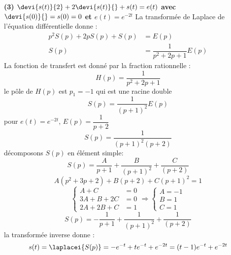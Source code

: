 \newpage
\question{}
\textbf{(3) $\devi{s(t)}{2} + 2\devi{s(t)}{} + s(t)=e(t)$ 
avec $\devi{s(0)}{}=s(0)=0$ et $e(t) = e^{-2t}$}
La transformée de Laplace de l'équation différentielle donne :
\begin{align*}
    p^2S(p)+2pS(p)+S(p)&=E(p) \\
    S(p)&=\dfrac{1}{p^2+2p+1}E(p)
\end{align*}
La fonction de transfert est donné par la fraction rationnelle :
$$
H(p)=\dfrac{1}{p^2+2p+1}
$$
le pôle de $H(p)$ est $p_1=-1$ qui est une racine double
$$
S(p) = \dfrac{1}{(p+1)^2}E(p)
$$
pour $e(t)=e^{-2t}$, $E(p)=\dfrac{1}{p+2}$
$$
S(p)=\dfrac{1}{(p+1)^2(p+2)}
$$
décomposons $S(p)$ en élément simple:
$$
S(p)=\dfrac{A}{p+1}+\dfrac{B}{(p+1)^2}+\dfrac{C}{(p+2)}
$$
$$
A(p^2+3p+2)+B(p+2)+C(p+1)^2=1
$$
$$
\begin{cases}
     A+C&=0 \\
    3A+B+2C&=0 \\
    2A+2B+C&=1
\end{cases}\Longrightarrow
\begin{cases}
    A=-1\\
    B=1\\
    C=1
\end{cases}
$$
$$
S(p)=-\dfrac{1}{p+1}+\dfrac{1}{(p+1)^2}+\dfrac{1}{(p+2)}
$$
la transformée inverse donne :
$$
s(t) = \laplacei{S(p)}= -e^{-t}+te^{-t}+e^{-2t} = (t-1)e^{-t}+e^{-2t}
$$
\begin{center}
\end{center}

